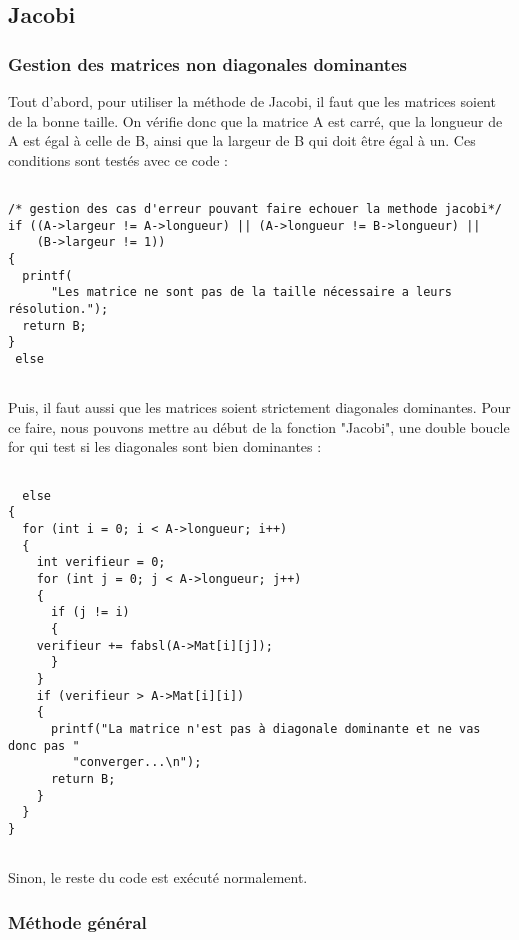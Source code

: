 \documentclass[letter]{article}
\begin{document}
\subsection{Jacobi}
\label{sec:org65f9d38}

\subsubsection{Gestion des matrices non diagonales dominantes}
\label{sec:org592da12}


Tout d'abord, pour utiliser la méthode de Jacobi, il faut que les matrices soient de la bonne taille. On vérifie donc que la matrice A est carré, que la longueur de A est égal à celle de B, ainsi que la largeur de B qui doit être égal à un. Ces conditions sont testés avec ce code :
\begin{verbatim}

/* gestion des cas d'erreur pouvant faire echouer la methode jacobi*/
if ((A->largeur != A->longueur) || (A->longueur != B->longueur) ||
    (B->largeur != 1))
{
  printf(
      "Les matrice ne sont pas de la taille nécessaire a leurs résolution.");
  return B;
}
 else


\end{verbatim}



Puis, il faut aussi que les matrices soient strictement diagonales dominantes.
Pour ce faire, nous pouvons mettre au début de la fonction "Jacobi", une double boucle for qui test si les diagonales sont bien dominantes :

\begin{verbatim}

  else
{
  for (int i = 0; i < A->longueur; i++)
  {
    int verifieur = 0;
    for (int j = 0; j < A->longueur; j++)
    {
      if (j != i)
      {
	verifieur += fabsl(A->Mat[i][j]);
      }
    }
    if (verifieur > A->Mat[i][i])
    {
      printf("La matrice n'est pas à diagonale dominante et ne vas donc pas "
	     "converger...\n");
      return B;
    }
  }
}


\end{verbatim}


Sinon, le reste du code est exécuté normalement.








\subsubsection{Méthode général}
\label{sec:orgb0f9ede}
\end{document}
